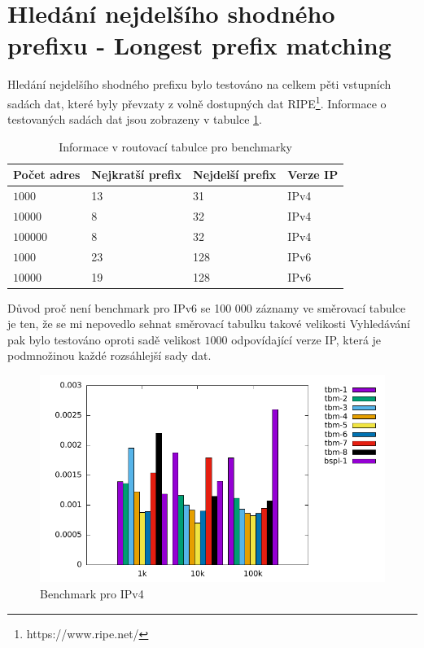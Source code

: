 \section{Hledání nejdelšího shodného prefixu - Longest prefix matching}\label{section:results-lpm} %

Hledání nejdelšího shodného prefixu bylo testováno na celkem pěti vstupních sadách dat, které
byly převzaty z volně dostupných dat RIPE\footnote{https://www.ripe.net/}.
Informace o testovaných sadách dat jsou zobrazeny v tabulce \ref{tab:lpm-input}.

\begin{table}[!htbp]
	\center
	\label{tab:lpm-input}
    \begin{tabular}{|l|l|l|l|}
    \hline
    Počet adres & Nejkratší prefix & Nejdelší prefix & Verze IP \\ \hline
    $1000$ & 13 & 31 & IPv4 \\ \hline
    $10000$ & 8 & 32 & IPv4 \\ \hline
    $100000$ & 8 & 32 & IPv4 \\ \hline
    $1000$ & 23 & 128 & IPv6 \\ \hline
    $10000$ & 19 & 128 & IPv6 \\ \hline
    \end{tabular}
	\caption{Informace v routovací tabulce pro benchmarky}
\end{table}

Důvod proč není benchmark pro IPv6 se 100 000 záznamy ve směrovací tabulce je ten, že se mi nepovedlo
sehnat směrovací tabulku takové velikosti
Vyhledávání pak bylo testováno oproti sadě velikost $1000$ odpovídající verze IP, která je podmnožinou každé
rozsáhlejší sady dat.

\begin{figure}[!htbp]
	\centering
	\includegraphics[scale=1]{fig/lpm-ipv4.pdf}
	\caption{Benchmark pro IPv4}
\end{figure}\label{fig:lpm-ipv4}


